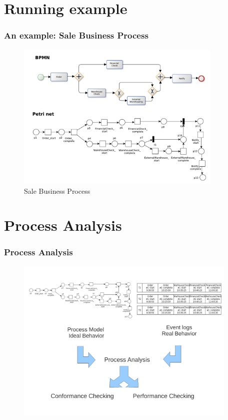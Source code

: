 \documentclass[10pt]{beamer}
\begin{document}
\section{Running example}
\begin{frame}
\frametitle{An example: Sale Business Process}
\begin{figure}
\includegraphics[width=280pt]{./item/SaleProcessModels.pdf}
\caption{Sale Business Process}
\end{figure}
\end{frame}

\section{Process Analysis}
\begin{frame}
\frametitle{ Process Analysis }
\begin{figure}
\includegraphics[width=300pt]{./item/analysis.pdf}
\end{figure}


\end{frame}
\end{document}

